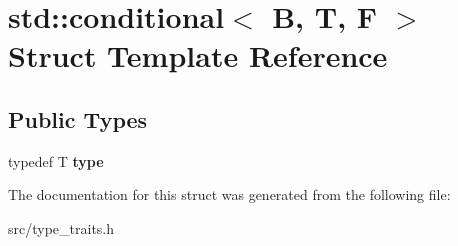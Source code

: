 \hypertarget{structstd_1_1conditional}{}\section{std\+:\+:conditional$<$ B, T, F $>$ Struct Template Reference}
\label{structstd_1_1conditional}
\subsection*{Public Types}
\begin{DoxyCompactItemize}
\item 
\hypertarget{structstd_1_1conditional_afa082101adbc68eaea9c49e34fa8ebfa}{}\label{structstd_1_1conditional_afa082101adbc68eaea9c49e34fa8ebfa} 
typedef T {\bfseries type}
\end{DoxyCompactItemize}


The documentation for this struct was generated from the following file\+:\begin{DoxyCompactItemize}
\item 
src/type\+\_\+traits.\+h\end{DoxyCompactItemize}
